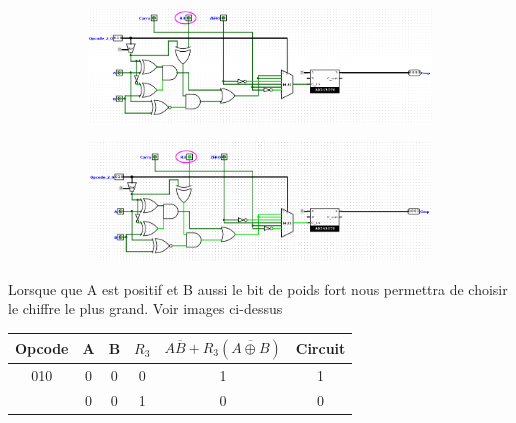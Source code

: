 \documentclass[a4paper]{article}
\begin{document}
\begin{tcolorbox}[colframe=Monokaimagenta,colback=white]
\smallskip
    
    
    
\begin{figure}[H]	
	\centering
	\begin{subfigure}[t]{1in}
		\centering
		\includegraphics[width=1.5\textwidth]{src/COMP_TEST_AlB.png}
		\label{fig:COMPARATEUR_l_EXEMPLE}
	\end{subfigure}
	\quad
	\begin{subfigure}[t]{1in}
		\centering
		\includegraphics[width=1.5\textwidth]{src/COMP_TEST_AlB1.png}
		\label{fig:COMPARATEUR_l_EXEMPLE_1}
	\end{subfigure}
\end{figure}        
    

        
    Lorsque que A est positif et B aussi le bit de poids fort nous permettra de choisir le chiffre le plus grand. Voir images ci-dessus 
\begin{tabular}{|c|c|c|c|cc|}
\hline    
Opcode & A & B & $R_3$ & $A\overline{B} + {R_3}(\overline{A \oplus B})$ & Circuit\\
\hline
    010    & 0 & 0 & 0     & 1             & 1\\
           & 0 & 0 & 1     & 0             & 0\\
    \hline
         
\end{tabular}

\smallskip
\begin{figure}[H]
    \centering
    

\end{figure}
\end{tcolorbox}
\end{document}
